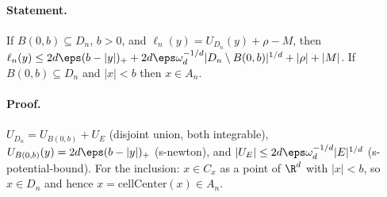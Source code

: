 \paragraph{Statement.} If $B(0,b)\subseteq D_n$, $b>0$, and $\ell_n(y)=U_{D_n}(y)+\rho-M$, then
$\ell_n(y)\leq2d\eps(b-|y|)_++2d\eps\omega_d^{-1/d}|D_n\setminus B(0,b)|^{1/d}+|\rho|+|M|$. If $B(0,b)\subseteq D_n$ and $|x|<b$ then $x\in A_n$.
\paragraph{Proof.} $U_{D_n}=U_{B(0,b)}+U_E$ (disjoint union, both integrable), $U_{B(0,b)}(y)=2d\eps(b-|y|)_+$ (s-newton), and $|U_E|\leq2d\eps\omega_d^{-1/d}|E|^{1/d}$ (s-potential-bound).
For the inclusion: $x\in C_x$ as a point of $\R^d$ with $|x|<b$, so $x\in D_n$ and hence $x=\mathrm{cellCenter}(x)\in A_n$.
